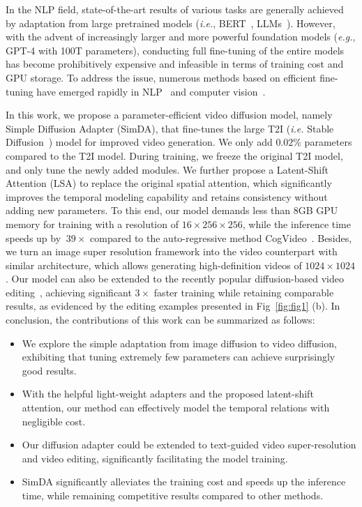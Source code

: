 In the NLP field, state-of-the-art results of various tasks are generally achieved by adaptation from large pretrained models (\emph{i.e.}, BERT~\cite{bert}, LLMs~\cite{dai2019transformer,radford2019language, raffel2020exploring, zhang2022opt}).
However, with the advent of increasingly larger and more powerful foundation models (\emph{e.g.}, GPT-4 with 100T parameters), conducting full fine-tuning of the entire models has become prohibitively expensive and infeasible in terms of training cost and GPU storage. 
To address the issue, numerous methods based on efficient fine-tuning have emerged rapidly in NLP~\cite{houlsby2019parameter, hu2021lora, li2021prefix, lester2021power} and computer vision~\cite{st-adapter, yang2023aim, multimodaladapter, chen2022adaptformer}.

In this work, we propose a parameter-efficient video diffusion model, namely Simple Diffusion Adapter (SimDA), that fine-tunes the large T2I (\emph{i.e.} Stable Diffusion~\cite{stablediffusion}) model for improved video generation. We only add $0.02\%$ parameters compared to the T2I model. During training, we freeze the original T2I model, and only tune the newly added modules. 
We further propose a Latent-Shift Attention (LSA) to replace the original spatial attention, which significantly improves the temporal modeling capability and retains consistency without adding new parameters.
To this end, our model demands less than 8GB GPU memory for training with a resolution of $16\times256\times256$, while the inference time speeds up by $~39\times$ compared to the auto-regressive method CogVideo~\cite{hong2022cogvideo}. 
Besides, we turn an image super resolution framework into the video counterpart with similar architecture, which allows generating high-definition videos of $1024\times1024$. 
Our model can also be extended to the recently popular diffusion-based video editing~\cite{tuneavideo}, achieving significant $3\times$ faster training while retaining comparable results, as evidenced by the editing examples presented in Fig~\ref{fig:fig1} (b).
In conclusion, the contributions of this work can be summarized as follows:
\begin{itemize}
\item We explore the simple adaptation from image diffusion to video diffusion, exhibiting that tuning extremely few parameters can achieve surprisingly good results.
\item With the helpful light-weight adapters and the proposed latent-shift attention, our method can effectively model the temporal relations with negligible cost.
\item Our diffusion adapter could be extended to text-guided video super-resolution and video editing, significantly facilitating the model training.
\item SimDA significantly alleviates the training cost and speeds up the inference time, while remaining competitive results compared to other methods.

\end{itemize}

